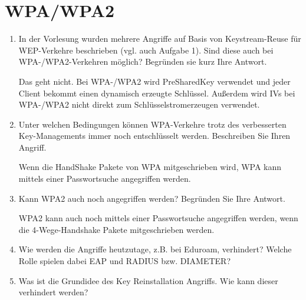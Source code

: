 \documentclass[12pt,a4paper]{article}
\newenvironment{exercise}
	{\begin{enumerate}[label=\bfseries\alph*).]\bfseries}
{\end{enumerate}}
\newenvironment{answer}{\par\normalfont}{}
\begin{document}
    \section{WPA/WPA2}
    	\begin{exercise}
    		\item In der Vorlesung wurden mehrere Angriffe auf Basis von Keystream-Reuse für WEP-Verkehre beschrieben (vgl. auch Aufgabe 1). Sind diese auch bei WPA-/WPA2-Verkehren möglich? Begründen sie kurz Ihre Antwort.
    			\begin{answer}
    				Das geht nicht. Bei WPA-/WPA2 wird PreSharedKey verwendet und jeder Client bekommt einen dynamisch erzeugte Schlüssel. Außerdem wird IVs bei WPA-/WPA2 nicht direkt zum Schlüsselstromerzeugen verwendet.
    			\end{answer}
    		\item Unter welchen Bedingungen können WPA-Verkehre trotz des verbesserten Key-Managements immer noch entschlüsselt werden. Beschreiben Sie Ihren Angriff.
    		\begin{answer}
    			Wenn die HandShake Pakete von WPA mitgeschrieben wird, WPA kann mittels einer Passwortsuche angegriffen werden.
    		\end{answer}
    		\item Kann WPA2 auch noch angegriffen werden? Begründen Sie Ihre Antwort.
    		\begin{answer}
    			WPA2 kann auch noch mittels einer Passwortsuche angegriffen werden, wenn die 4-Wege-Handshake Pakete mitgeschrieben werden.
    		\end{answer}
    		\item Wie werden die Angriffe heutzutage, z.B. bei Eduroam, verhindert? Welche Rolle spielen dabei EAP und RADIUS bzw. DIAMETER?
    		\item Was ist die Grundidee des Key Reinstallation Angriffs. Wie kann dieser verhindert werden?
    		
    	\end{exercise}
\end{document}
